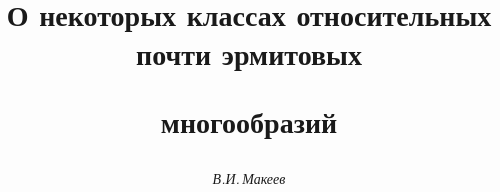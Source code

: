 

 


%  


 


\newcommand{\tts}[1]{} 


 




 


\setcounter{page}{80} 












\author{\it В.И.\,Макеев} 




\title{О некоторых классах относительных\\ почти эрмитовых 


многообразий} 


 


\date{} 




\pagestyle{plain} %


 




\maketitle 


\label{begin} 


 


